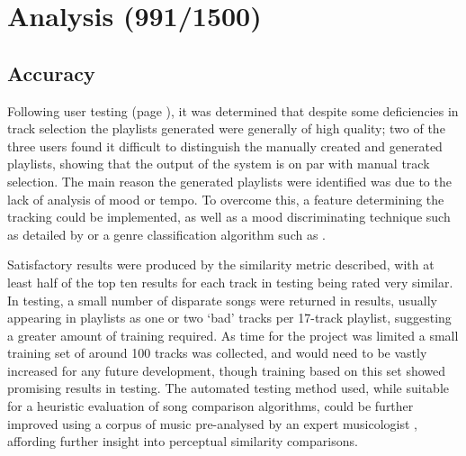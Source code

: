 \chapter{Analysis (991/1500)}
\begin{comment}
	\item Subject the findings to scrutiny as to what they might mean
	\item Discussion and analysis of the theories, ideas, issues and challenges noted earlier in the writing. Do you have both intended and unintended outcomes?
	\item A `making sense' of the findings by considering their implications for the questions raised
	\item A critique of the research method (data collection tools?) used and their validity and reliability
\end{comment}
\section{Accuracy}
Following user testing (page \pageref{text:testing:user}), it was determined that despite some deficiencies in track selection the playlists generated were generally of high quality; two of the three users found it difficult to distinguish the manually created and generated playlists, showing that the output of the system is on par with manual track selection. The main reason the generated playlists were identified was due to the lack of analysis of mood or tempo. To overcome this, a feature determining the tracking could be implemented, as well as a mood discriminating technique such as detailed by \citet*{Liu2003} or a genre classification algorithm such as \citet*{Basili2004}.

Satisfactory results were produced by the similarity metric described, with at least half of the top ten results for each track in testing being rated very similar. In testing, a small number of disparate songs were returned in results, usually appearing in playlists as one or two `bad' tracks per 17-track playlist, suggesting a greater amount of training required. As time for the project was limited a small training set of around 100 tracks was collected, and would need to be vastly increased for any future development, though training based on this set showed promising results in testing. The automated testing method used, while suitable for a heuristic evaluation of song comparison algorithms, could be further improved using a corpus of music pre-analysed by an expert musicologist \citep{Muellensiefen2004}, affording further insight into perceptual similarity comparisons.

